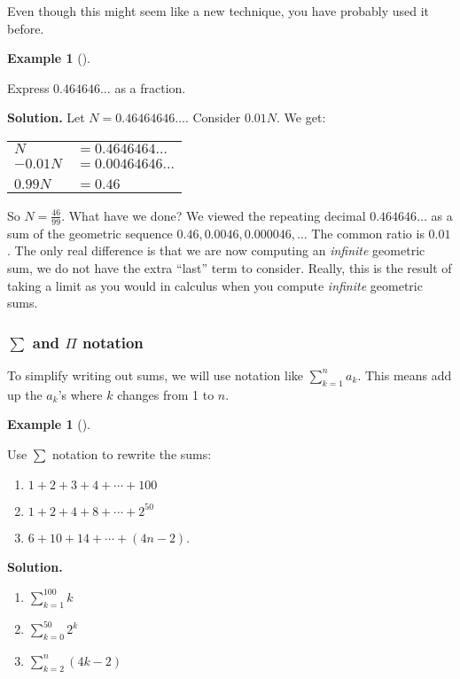 \documentclass[10pt,]{book}
\theoremstyle{plain}
\theoremstyle{definition}
\newtheorem{example}[theorem]{Example}
\theoremstyle{definition}
\theoremstyle{definition}
\numberwithin{equation}{chapter}
\newcommand{\hrulethin}  {\noalign{\hrule height 0.04em}}
\def\d{\displaystyle}
\def\prod{\Pi}
\begin{document}
        Even though this might seem like a new technique, you have probably used it before.
\begin{example}[]\label{example-67}

            Express \(0.464646\ldots\) as a fraction.
\par\medskip\noindent%
\textbf{Solution.}\quad
            Let \(N = 0.46464646\ldots\). Consider \(0.01N\). We get:
\begin{tabular}{ll}
\(N\)&\(= 0.4646464\ldots\)\tabularnewline[0pt]
\(-0.01N\)&\(= 0.00464646\ldots\)\tabularnewline[0pt]
&\tabularnewline\hrulethin
\(0.99N\)&\(= 0.46\)
\end{tabular}
\par

            So \(N = \frac{46}{99}\). What have we done? We viewed the repeating decimal \(0.464646\ldots\) as a sum of the geometric sequence \(0.46, 0.0046, 0.000046, \ldots\) The common ratio is \(0.01\). The only real difference is that we are now computing an \emph{infinite} geometric sum, we do not have the extra ``last'' term to consider. Really, this is the result of taking a limit as you would in calculus when you compute \emph{infinite} geometric sums.
\end{example}
\typeout{************************************************}
\typeout{Subsubsection  \(\sum\) and \(\prod\) notation}
\typeout{************************************************}
\subsubsection[\(\sum\) and \(\prod\) notation]{\(\sum\) and \(\prod\) notation}\label{subsubsection-3}

        To simplify writing out sums, we will use notation like \(\d\sum_{k=1}^n a_k\). This means add up the \(a_k\)'s where \(k\) changes from 1 to \(n\).
\begin{example}[]\label{example-68}

            Use \(\sum\) notation to rewrite the sums:
\leavevmode%
\begin{enumerate}
\item\hypertarget{li-885}{}\(1 + 2 + 3 + 4 + \cdots + 100\)%
\item\hypertarget{li-886}{}\(1 + 2 + 4 + 8 + \cdots + 2^{50}\)%
\item\hypertarget{li-887}{}\(6 + 10 + 14 + \cdots + (4n - 2)\).%
\end{enumerate}
\par\medskip\noindent%
\textbf{Solution.}\quad \leavevmode%
\begin{enumerate}
\item\hypertarget{li-888}{}\(\d\sum_{k=1}^{100} k\)%
\item\hypertarget{li-889}{}\(\d\sum_{k=0}^{50} 2^k\)%
\item\hypertarget{li-890}{}\(\d\sum_{k=2}^{n} (4k -2)\)%
\end{enumerate}
\end{example}
\par
\end{document}
